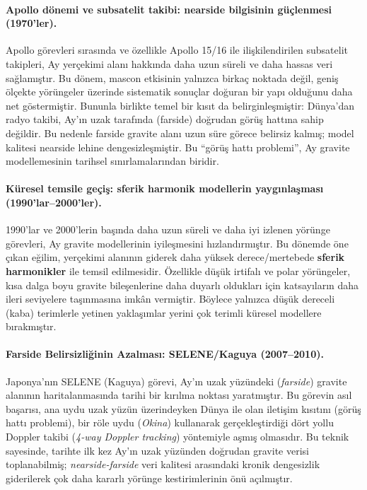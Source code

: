 \paragraph{Apollo dönemi ve subsatelit takibi: nearside bilgisinin güçlenmesi (1970'ler).}
Apollo görevleri sırasında ve özellikle Apollo 15/16 ile ilişkilendirilen subsatelit takipleri,
Ay yerçekimi alanı hakkında daha uzun süreli ve daha hassas veri sağlamıştır. Bu dönem,
mascon etkisinin yalnızca birkaç noktada değil, geniş ölçekte yörüngeler üzerinde sistematik sonuçlar doğuran
bir yapı olduğunu daha net göstermiştir. Bununla birlikte temel bir kısıt da belirginleşmiştir:
Dünya’dan radyo takibi, Ay’ın uzak tarafında (farside) doğrudan görüş hattına sahip değildir.
Bu nedenle farside gravite alanı uzun süre görece belirsiz kalmış; model kalitesi nearside lehine
dengesizleşmiştir. Bu ``görüş hattı problemi'', Ay gravite modellemesinin tarihsel sınırlamalarından biridir.

\paragraph{Küresel temsile geçiş: sferik harmonik modellerin yaygınlaşması (1990'lar--2000'ler).}
1990’lar ve 2000’lerin başında daha uzun süreli ve daha iyi izlenen yörünge görevleri,
Ay gravite modellerinin iyileşmesini hızlandırmıştır. Bu dönemde öne çıkan eğilim,
yerçekimi alanının giderek daha yüksek derece/mertebede \textbf{sferik harmonikler} ile temsil edilmesidir.
Özellikle düşük irtifalı ve polar yörüngeler, kısa dalga boyu gravite bileşenlerine daha duyarlı oldukları için
katsayıların daha ileri seviyelere taşınmasına imkân vermiştir. Böylece yalnızca düşük dereceli (kaba) terimlerle yetinen
yaklaşımlar yerini çok terimli küresel modellere bırakmıştır.

\paragraph{Farside Belirsizliğinin Azalması: SELENE/Kaguya (2007--2010).} Japonya'nın SELENE (Kaguya) görevi, Ay'ın uzak yüzündeki (\textit{farside}) gravite alanının haritalanmasında tarihi bir kırılma noktası yaratmıştır. Bu görevin asıl başarısı, ana uydu uzak yüzün üzerindeyken Dünya ile olan iletişim kısıtını (görüş hattı problemi), bir röle uydu (\textit{Okina}) kullanarak gerçekleştirdiği dört yollu Doppler takibi (\textit{4-way Doppler tracking}) yöntemiyle aşmış olmasıdır. Bu teknik sayesinde, tarihte ilk kez Ay'ın uzak yüzünden doğrudan gravite verisi toplanabilmiş; \textit{nearside-farside} veri kalitesi arasındaki kronik dengesizlik giderilerek çok daha kararlı yörünge kestirimlerinin önü açılmıştır.

